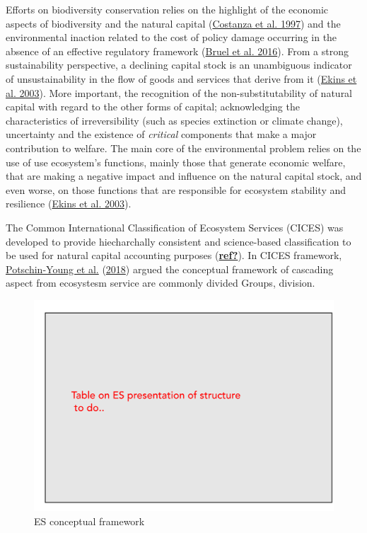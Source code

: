 \documentclass[
]{article}
\begin{document}
Efforts on biodiversity conservation relies on the highlight of the economic aspects of biodiversity and the natural capital (\protect\hyperlink{ref-Costanza1997}{Costanza et al. 1997}) and the environmental inaction related to the cost of policy damage occurring in the absence of an effective regulatory framework (\protect\hyperlink{ref-Bruel2016}{Bruel et al. 2016}).
From a strong sustainability perspective, a declining capital stock is an unambiguous indicator of unsustainability in the flow of goods and services that derive from it (\protect\hyperlink{ref-Ekins2003}{Ekins et al. 2003}).
More important, the recognition of the non-substitutability of natural capital with regard to the other forms of capital; acknowledging the characteristics of irreversibility (such as species extinction or climate change), uncertainty and the existence of \emph{critical} components that make a major contribution to welfare.
The main core of the environmental problem relies on the use of use ecosystem's functions, mainly those that generate economic welfare, that are making a negative impact and influence on the natural capital stock, and even worse, on those functions that are responsible for ecosystem stability and resilience (\protect\hyperlink{ref-Ekins2003}{Ekins et al. 2003}).

The Common International Classification of Ecosystem Services (CICES) was developed to provide hiecharchally consistent and science-based classification to be used for natural capital accounting purposes (\protect\hyperlink{ref-ref}{\textbf{ref?}}).
In CICES framework, \protect\hyperlink{ref-Potschin-Young2018}{Potschin-Young et al.} (\protect\hyperlink{ref-Potschin-Young2018}{2018}) argued the conceptual framework of cascading aspect from ecosystesm service are commonly divided Groups, division.

\begin{figure}[!ht]

{\centering \includegraphics[width=1\linewidth]{Figures/cices} 

}

\caption{ES conceptual framework}\label{fig:Fig-ES-cices}
\end{figure}
\end{document}

